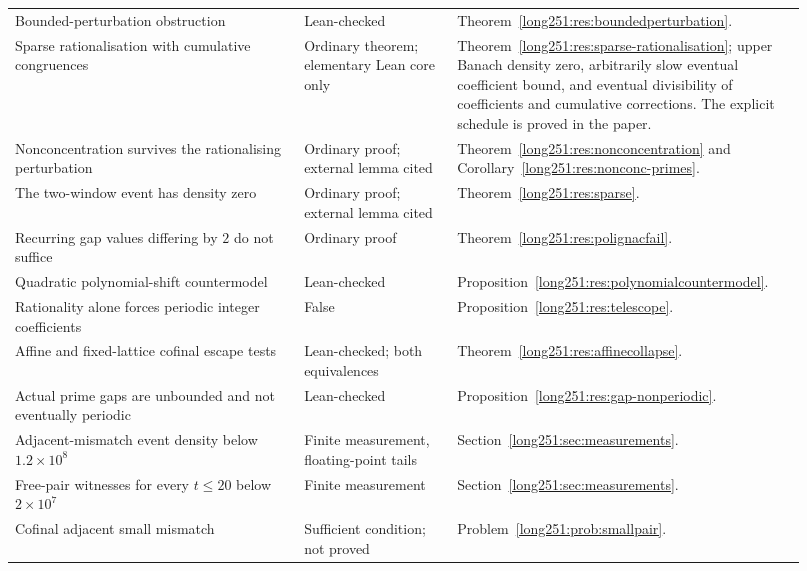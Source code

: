 \documentclass[11pt]{article}
\begin{document}
\begin{longtable}{@{}
  >{\raggedright\arraybackslash}p{0.34\linewidth}
  >{\raggedright\arraybackslash}p{0.18\linewidth}
  >{\raggedright\arraybackslash}p{0.40\linewidth}@{}}
Bounded-perturbation obstruction & Lean-checked & Theorem~\ref{long251:res:boundedperturbation}. \\
Sparse rationalisation with cumulative congruences & Ordinary theorem; elementary Lean core only & Theorem~\ref{long251:res:sparse-rationalisation}; upper Banach density zero, arbitrarily slow eventual coefficient bound, and eventual divisibility of coefficients and cumulative corrections. The explicit schedule is proved in the paper. \\
Nonconcentration survives the rationalising perturbation & Ordinary proof; external lemma cited & Theorem~\ref{long251:res:nonconcentration} and Corollary~\ref{long251:res:nonconc-primes}. \\
The two-window event has density zero & Ordinary proof; external lemma cited & Theorem~\ref{long251:res:sparse}. \\
Recurring gap values differing by $2$ do not suffice & Ordinary proof & Theorem~\ref{long251:res:polignacfail}. \\
Quadratic polynomial-shift countermodel & Lean-checked & Proposition~\ref{long251:res:polynomialcountermodel}. \\
Rationality alone forces periodic integer coefficients & False & Proposition~\ref{long251:res:telescope}. \\
Affine and fixed-lattice cofinal escape tests & Lean-checked; both equivalences & Theorem~\ref{long251:res:affinecollapse}. \\
Actual prime gaps are unbounded and not eventually periodic & Lean-checked & Proposition~\ref{long251:res:gap-nonperiodic}. \\
Adjacent-mismatch event density below $1.2\times10^{8}$ & Finite measurement, floating-point tails & Section~\ref{long251:sec:measurements}. \\
Free-pair witnesses for every $t\le20$ below $2\times10^{7}$ & Finite measurement & Section~\ref{long251:sec:measurements}. \\
Cofinal adjacent small mismatch & Sufficient condition; not proved & Problem~\ref{long251:prob:smallpair}. \\
\bottomrule
\end{longtable}
\endgroup

\smallskip
{}
\end{document}
